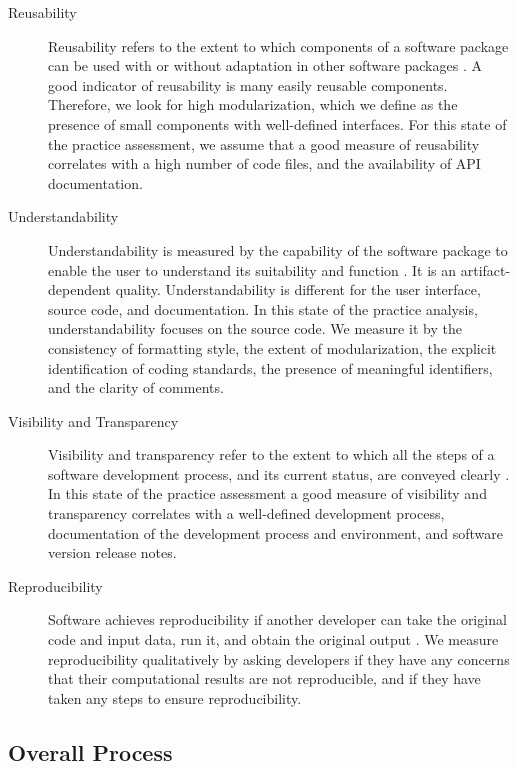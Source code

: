 \documentclass[final, 3p, times, authoryear]{elsarticle}
\begin{document}
\begin{description}
	\item[Reusability] Reusability refers to the extent to which components of a
	software package can be used with or without adaptation in other software
	packages \citep{kalagiakos2003non}. A good indicator of reusability is many
	easily reusable components. Therefore, we look for high modularization,
	which we define as the presence of small components with well-defined
	interfaces. For this state of the practice assessment, we assume that a good
	measure of reusability correlates with a high number of code files, and the
	availability of API documentation. 
	
	\item[Understandability] Understandability is measured by the capability of
	the software package to enable the user to understand its suitability and
	function \citep{ISO9126}. It is an artifact-dependent quality.
	Understandability is different for the user interface, source code, and
	documentation. In this state of the practice analysis, understandability
	focuses on the source code. We measure it by the consistency of formatting
	style, the extent of modularization, the explicit identification of coding
	standards, the presence of meaningful identifiers, and the clarity of
	comments.
	
	\item[Visibility and Transparency] Visibility and transparency refer to the
	extent to which all the steps of a software development process, and its
	current status, are conveyed clearly \citep[p.\ 32]{GhezziEtAl2003}. In this
	state of the practice assessment a good measure of visibility and
	transparency correlates with a well-defined development process,
	documentation of the development process and environment, and software
	version release notes.
	
	\item[Reproducibility] Software achieves reproducibility if another
	developer can take the original code and input data, run it, and obtain the
	original output \citep{BenureauAndRougier2017}. We measure reproducibility
	qualitatively by asking developers if they have any concerns that their
	computational results are not reproducible, and if they have taken any
	steps to ensure reproducibility.
					 
\end{description}

\subsection{Overall Process} \label{Sec_OverallProcess}
\end{document}
